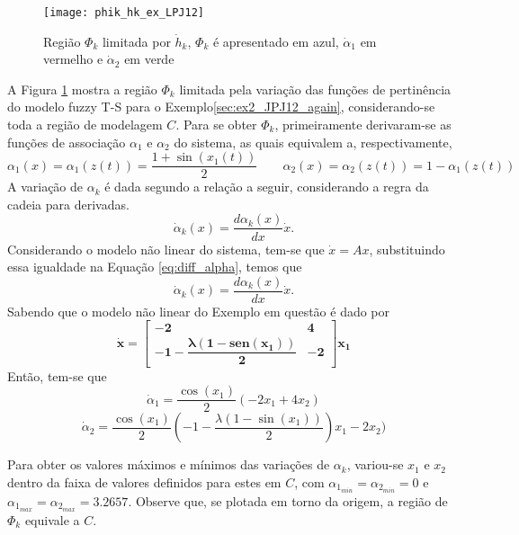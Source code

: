 \begin{figure}[htbp]
	\centering
	\texttt{[image: phik\_hk\_ex\_LPJ12]}
	\caption{Região $\Phi_k$ limitada por $\dot{h}_k$, $\Phi_k$ é apresentado em azul, $\dot{\alpha}_1$ em vermelho e $\dot{\alpha}_2$ em verde}
	\label{fig:hk_phik}
\end{figure}

A Figura \ref{fig:hk_phik} mostra a região $\Phi_k$ limitada pela variação das funções de pertinência do modelo fuzzy T-S para o Exemplo\ref{sec:ex2_JPJ12_again}, considerando-se toda a região de modelagem $C$. Para se obter $\Phi_k$, primeiramente derivaram-se as funções de associação $\alpha_1$ e $\alpha_2$ do sistema, as quais equivalem a, respectivamente,
\begin{equation}\label{eq:func_assoc_LPJ12}
\alpha_1(x) = \alpha_1(z(t)) = \dfrac{1+\sin(x_1(t))}{2}\qquad \alpha_2(x) = \alpha_2(z(t)) = 1 - \alpha_1(z(t))
\end{equation}
A variação de $\alpha_k$ é dada segundo a relação a seguir, considerando a regra da cadeia para derivadas.
\begin{equation}\label{eq:diff_alpha}
\dot{\alpha}_k(x) = \dfrac{d\alpha_k(x)}{dx} \dot{x}.
\end{equation}
Considerando o modelo não linear do sistema, tem-se que $\dot{x} = Ax$, substituindo essa igualdade na Equação \ref{eq:diff_alpha}, temos que
\begin{equation}\label{eq:diff_alpha}
\dot{\alpha}_k(x) = \dfrac{d\alpha_k(x)}{dx} \dot{x}.
\end{equation}
Sabendo que o modelo não linear do Exemplo em questão é dado por
\begin{equation*}
\mathbf{\dot{x} = \begin{bmatrix} -2 & 4\\  -1 - \dfrac{\lambda (1 - sen(x_1))}{2} & -2 \end{bmatrix}x_1}
\end{equation*}
Então, tem-se que
\begin{equation}\label{eq:dot_h_1}
\dot{\alpha}_1 = \dfrac{\cos(x_1)}{2}(-2x_1+4x_2)
\end{equation}
\begin{equation}\label{eq:dot_h_2}
\dot{\alpha}_2 = \dfrac{\cos(x_1)}{2}(-1-\dfrac{\lambda (1-\sin(x_1))}{2})x_1-2x_2)
\end{equation}

Para obter os valores máximos e mínimos das variações de $\alpha_k$, variou-se $x_1$ e $x_2$ dentro da faixa de valores definidos para estes em $C$, com $\alpha_{1_{min}} = \alpha_{2_{min}} = 0$ e $\alpha_{1_{max}} = \alpha_{2_{max}} = 3.2657$. Observe que, se plotada em torno da origem, a região de $\Phi_k$ equivale a $C$.

